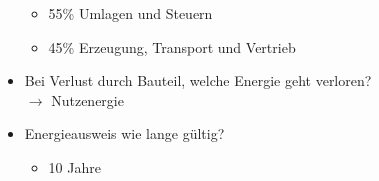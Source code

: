 \documentclass[fleqn,twoside,dvipsnames]{article}
\begin{document}
\begin{itemize}
                \begin{itemize}
                    \item 55\% Umlagen und Steuern
                    \item 45\% Erzeugung, Transport und Vertrieb
                \end{itemize}
            \item Bei Verlust durch Bauteil, welche Energie geht verloren? \\
                $\rightarrow$ Nutzenergie
            \item Energieausweis wie lange gültig?
                \begin{itemize}
                    \item 10 Jahre
                \end{itemize}
        \end{itemize}


                 
        
            
\end{document}
